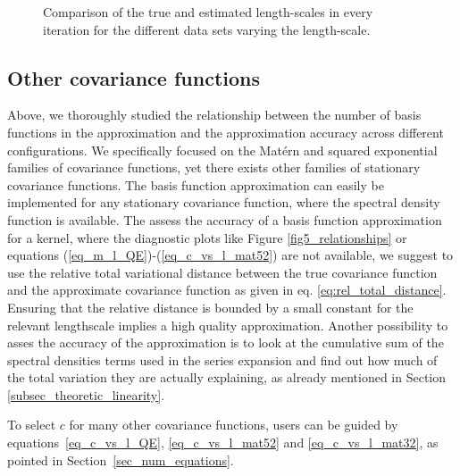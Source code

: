\begin{figure}
\centering
{}
\caption{Comparison of the true and estimated length-scales in every iteration for the different data sets varying the length-scale.}
  \label{fig7_diagnostic_lscale_comparison}
\end{figure}


\subsection{Other covariance functions}

Above, we thoroughly studied the relationship between the number of basis functions in the approximation and the approximation accuracy across different configurations. We specifically focused on the Matérn and squared exponential families of covariance functions, yet there exists other families of stationary covariance functions. The basis function approximation can easily be implemented for any stationary covariance function, where the spectral density function is available. The assess the accuracy of a basis function approximation for a kernel, where the diagnostic plots like Figure \ref{fig5_relationships} or equations (\ref{eq_m_l_QE})-(\ref{eq_c_vs_l_mat52}) are not available, we suggest to use the relative total variational distance between the true covariance function and the approximate covariance function as given in eq. \eqref{eq:rel_total_distance}. Ensuring that the relative distance is bounded by a small constant for the relevant lengthscale implies a high quality approximation. Another possibility to asses the accuracy of the approximation is to look at the cumulative sum of the spectral densities terms used in the series expansion and find out how much of the total variation they are actually explaining, as already mentioned in Section \ref{subsec_theoretic_linearity}. 

To select $c$ for many other covariance functions, users can be guided by equations~\eqref{eq_c_vs_l_QE}, \eqref{eq_c_vs_l_mat52} and \eqref{eq_c_vs_l_mat32}, as pointed in Section~\ref{sec_num_equations}.

